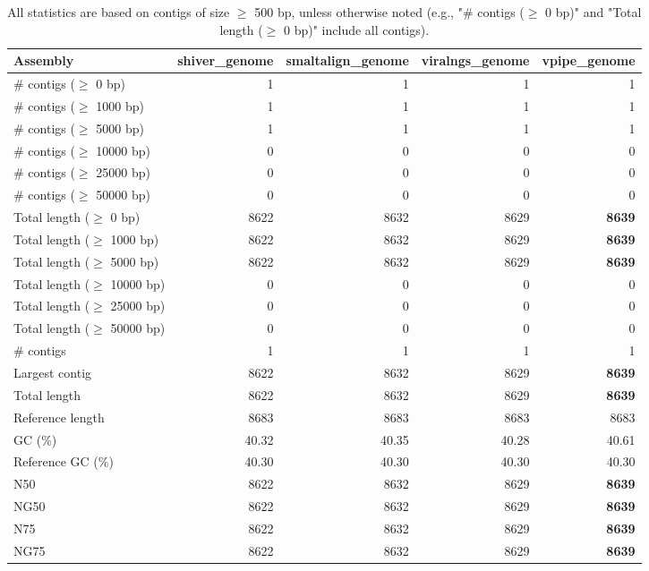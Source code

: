 \documentclass[12pt,a4paper]{article}
\begin{document}
\begin{table}[ht]
\begin{center}
\caption{All statistics are based on contigs of size $\geq$ 500 bp, unless otherwise noted (e.g., "\# contigs ($\geq$ 0 bp)" and "Total length ($\geq$ 0 bp)" include all contigs).}
\begin{tabular}{|l*{4}{|r}|}
\hline
Assembly & shiver\_genome & smaltalign\_genome & viralngs\_genome & vpipe\_genome \\ \hline
\# contigs ($\geq$ 0 bp) & 1 & 1 & 1 & 1 \\ \hline
\# contigs ($\geq$ 1000 bp) & 1 & 1 & 1 & 1 \\ \hline
\# contigs ($\geq$ 5000 bp) & 1 & 1 & 1 & 1 \\ \hline
\# contigs ($\geq$ 10000 bp) & 0 & 0 & 0 & 0 \\ \hline
\# contigs ($\geq$ 25000 bp) & 0 & 0 & 0 & 0 \\ \hline
\# contigs ($\geq$ 50000 bp) & 0 & 0 & 0 & 0 \\ \hline
Total length ($\geq$ 0 bp) & 8622 & 8632 & 8629 & {\bf 8639} \\ \hline
Total length ($\geq$ 1000 bp) & 8622 & 8632 & 8629 & {\bf 8639} \\ \hline
Total length ($\geq$ 5000 bp) & 8622 & 8632 & 8629 & {\bf 8639} \\ \hline
Total length ($\geq$ 10000 bp) & 0 & 0 & 0 & 0 \\ \hline
Total length ($\geq$ 25000 bp) & 0 & 0 & 0 & 0 \\ \hline
Total length ($\geq$ 50000 bp) & 0 & 0 & 0 & 0 \\ \hline
\# contigs & 1 & 1 & 1 & 1 \\ \hline
Largest contig & 8622 & 8632 & 8629 & {\bf 8639} \\ \hline
Total length & 8622 & 8632 & 8629 & {\bf 8639} \\ \hline
Reference length & 8683 & 8683 & 8683 & 8683 \\ \hline
GC (\%) & 40.32 & 40.35 & 40.28 & 40.61 \\ \hline
Reference GC (\%) & 40.30 & 40.30 & 40.30 & 40.30 \\ \hline
N50 & 8622 & 8632 & 8629 & {\bf 8639} \\ \hline
NG50 & 8622 & 8632 & 8629 & {\bf 8639} \\ \hline
N75 & 8622 & 8632 & 8629 & {\bf 8639} \\ \hline
NG75 & 8622 & 8632 & 8629 & {\bf 8639} \\ \hline

\end{tabular}
\end{center}
\end{table}
\end{document}
